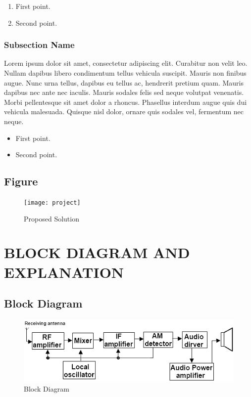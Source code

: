 \documentclass[12pt,a4paper]{report}
\begin{document}
\begin{enumerate}
\item First point.
\item Second point.
\end{enumerate}

\subsection{Subsection Name}
Lorem ipsum dolor sit amet, consectetur adipiscing elit. Curabitur non velit leo. Nullam dapibus libero condimentum tellus vehicula suscipit. Mauris non finibus augue. Nunc urna tellus, dapibus eu tellus ac, hendrerit pretium quam. Mauris dapibus nec ante nec iaculis. Mauris sodales felis sed neque volutpat venenatis. Morbi pellentesque sit amet dolor a rhoncus. Phasellus interdum augue quis dui vehicula malesuada. Quisque nisl dolor, ornare quis sodales vel, fermentum nec neque. 

\begin{itemize}
\item First point.
\item Second point.
\end{itemize}


 \section{Figure}

\begin{figure}[H]
	\begin{center}
		\leavevmode
			\texttt{[image: project]}
	\end{center}
		\caption{Proposed Solution}
		\label{fig:Solution}
\end{figure}




\chapter{BLOCK DIAGRAM AND EXPLANATION}

\section{Block Diagram}

\begin{figure}[H]
	\begin{center}
		\leavevmode
			\includegraphics[width=.6\textwidth]{block}
	\end{center}
		\caption{Block Diagram}
		\label{fig:Block Diagram}
\end{figure}
\end{document}
